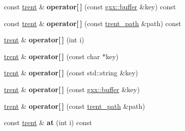 \begin{DoxyCompactItemize}
\item 
const \hyperlink{classgxx_1_1trent}{trent} \& {\bfseries operator\mbox{[}$\,$\mbox{]}} (const \hyperlink{classgxx_1_1buffer}{gxx\+::buffer} \&key) const \hypertarget{classgxx_1_1trent_afeebf21c610bd8ce110217bf626954ce}{}\label{classgxx_1_1trent_afeebf21c610bd8ce110217bf626954ce}

\item 
const \hyperlink{classgxx_1_1trent}{trent} \& {\bfseries operator\mbox{[}$\,$\mbox{]}} (const \hyperlink{structgxx_1_1trent__path}{trent\+\_\+path} \&path) const \hypertarget{classgxx_1_1trent_a39a2a822a455ca047dc5717b4f71f9f0}{}\label{classgxx_1_1trent_a39a2a822a455ca047dc5717b4f71f9f0}

\item 
\hyperlink{classgxx_1_1trent}{trent} \& {\bfseries operator\mbox{[}$\,$\mbox{]}} (int i)\hypertarget{classgxx_1_1trent_a1b083c044eccc746500e5adb6987ebeb}{}\label{classgxx_1_1trent_a1b083c044eccc746500e5adb6987ebeb}

\item 
\hyperlink{classgxx_1_1trent}{trent} \& {\bfseries operator\mbox{[}$\,$\mbox{]}} (const char $\ast$key)\hypertarget{classgxx_1_1trent_a42cac2505febfee76150b59b6aeba29b}{}\label{classgxx_1_1trent_a42cac2505febfee76150b59b6aeba29b}

\item 
\hyperlink{classgxx_1_1trent}{trent} \& {\bfseries operator\mbox{[}$\,$\mbox{]}} (const std\+::string \&key)\hypertarget{classgxx_1_1trent_a43f659d97360563d75bdfddf43316513}{}\label{classgxx_1_1trent_a43f659d97360563d75bdfddf43316513}

\item 
\hyperlink{classgxx_1_1trent}{trent} \& {\bfseries operator\mbox{[}$\,$\mbox{]}} (const \hyperlink{classgxx_1_1buffer}{gxx\+::buffer} \&key)\hypertarget{classgxx_1_1trent_a819dd14561411439a176901a31f2500e}{}\label{classgxx_1_1trent_a819dd14561411439a176901a31f2500e}

\item 
\hyperlink{classgxx_1_1trent}{trent} \& {\bfseries operator\mbox{[}$\,$\mbox{]}} (const \hyperlink{structgxx_1_1trent__path}{trent\+\_\+path} \&path)\hypertarget{classgxx_1_1trent_a90c11bf55b67ab051a05142cdf32be07}{}\label{classgxx_1_1trent_a90c11bf55b67ab051a05142cdf32be07}

\item 
const \hyperlink{classgxx_1_1trent}{trent} \& {\bfseries at} (int i) const \hypertarget{classgxx_1_1trent_a53a4a33c94802b8b260ddf1dc037ccb4}{}\label{classgxx_1_1trent_a53a4a33c94802b8b260ddf1dc037ccb4}


\end{DoxyCompactItemize}
